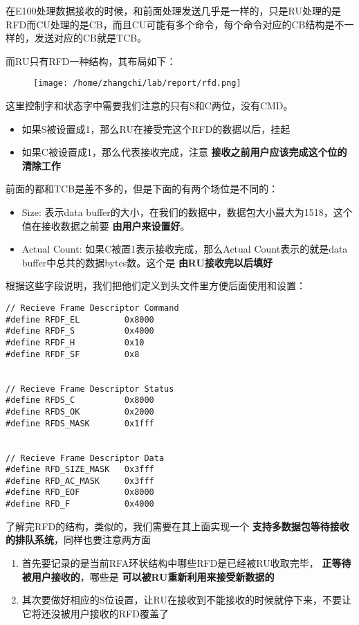 \documentclass{article}
\newcommand{\highlight}[1]{{\bfseries \color{red}  #1}}
\begin{document}
\begin{CJK*}{UTF8}{gkai}
在E100处理数据接收的时候，和前面处理发送几乎是一样的，只是RU处理的是RFD而CU处理的是CB，而且CU可能有多个命令，每个命令对应的CB结构是不一样的，发送对应的CB就是TCB。

而RU只有RFD一种结构，其布局如下：

\begin{figure}[htp]
\centering
\texttt{[image: /home/zhangchi/lab/report/rfd.png]}
\end{figure}

这里控制字和状态字中需要我们注意的只有S和C两位，没有CMD。
\begin{itemize}
\item{如果S被设置成1，那么RU在接受完这个RFD的数据以后，挂起}
\item{如果C被设置成1，那么代表接收完成，注意\highlight{接收之前用户应该完成这个位的清除工作}}
\end{itemize}

前面的都和TCB是差不多的，但是下面的有两个场位是不同的：

\begin{itemize}
\item{Size: 表示data buffer的大小，在我们的数据中，数据包大小最大为1518，这个值在接收数据之前要\highlight{由用户来设置好}。}
\item{Actual Count: 如果C被置1表示接收完成，那么Actual Count表示的就是data buffer中总共的数据bytes数。这个是\highlight{由RU接收完以后填好}}
\end{itemize}

根据这些字段说明，我们把他们定义到头文件里方便后面使用和设置：

\begin{lstlisting}[style=ccode, title={\scriptsize \ttfamily \bfseries kern/e100.h}]
// Recieve Frame Descriptor Command
#define RFDF_EL         0x8000
#define RFDF_S          0x4000
#define RFDF_H          0x10
#define RFDF_SF         0x8


// Recieve Frame Descriptor Status
#define RFDS_C          0x8000
#define RFDS_OK         0x2000
#define RFDS_MASK       0x1fff


// Recieve Frame Descriptor Data
#define RFD_SIZE_MASK   0x3fff
#define RFD_AC_MASK     0x3fff
#define RFD_EOF         0x8000
#define RFD_F           0x4000
\end{lstlisting}

了解完RFD的结构，类似的，我们需要在其上面实现一个\highlight{支持多数据包等待接收的排队系统}，同样也要注意两方面
\begin{enumerate}
\item{首先要记录的是当前RFA环状结构中哪些RFD是已经被RU收取完毕，\highlight{正等待被用户接收的}，哪些是\highlight{可以被RU重新利用来接受新数据的}}
\item{其次要做好相应的S位设置，让RU在接收到不能接收的时候就停下来，不要让它将还没被用户接收的RFD覆盖了}
\end{enumerate}


\end{CJK*}
\end{document}
